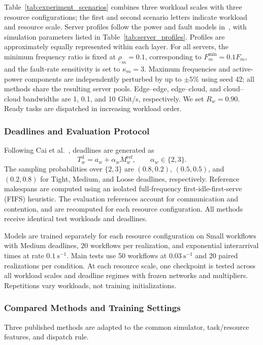 \documentclass[journal]{IEEEtran}
\begin{document}
Table~\ref{tab:experiment_scenarios} combines three workload scales with three resource configurations; the first and second scenario letters indicate workload and resource scale. Server profiles follow the power and fault models in~\cite{zhang2017,wu2018}, with simulation parameters listed in Table~\ref{tab:server_profiles}. Profiles are approximately equally represented within each layer. For all servers, the minimum frequency ratio is fixed at $\underline\rho_m=0.1$, corresponding to $F_m^{\min}=0.1F_m$, and the fault-rate sensitivity is set to $\kappa_m=3$. Maximum frequencies and active-power components are independently perturbed by up to $\pm5\%$ using seed 42; all methods share the resulting server pools. Edge--edge, edge--cloud, and cloud--cloud bandwidths are 1, 0.1, and 10 Gbit/s, respectively. We set $R_w=0.90$. Ready tasks are dispatched in increasing workload order.

\subsubsection{Deadlines and Evaluation Protocol}

Following Cai et al.~\cite{cai2025}, deadlines are generated as
\[
    T_w^{\mathrm d}=a_w+\alpha_w M_w^{\mathrm{ref}},
    \qquad \alpha_w\in\{2,3\}.
\]
The sampling probabilities over $\{2,3\}$ are $(0.8,0.2)$, $(0.5,0.5)$, and $(0.2,0.8)$ for Tight, Medium, and Loose deadlines, respectively. Reference makespans are computed using an isolated full-frequency first-idle-first-serve (FIFS) heuristic. The evaluation references account for communication and contention, and are recomputed for each resource configuration. All methods receive identical test workloads and deadlines.

Models are trained separately for each resource configuration on Small workflows with Medium deadlines, 20 workflows per realization, and exponential interarrival times at rate $0.1~\mathrm{s}^{-1}$. Main tests use 50 workflows at $0.03~\mathrm{s}^{-1}$ and 20 paired realizations per condition. At each resource scale, one checkpoint is tested across all workload scales and deadline regimes with frozen networks and multipliers. Repetitions vary workloads, not training initializations.

\subsubsection{Compared Methods and Training Settings}

Three published methods are adapted to the common simulator, task/resource features, and dispatch rule.
\end{document}
